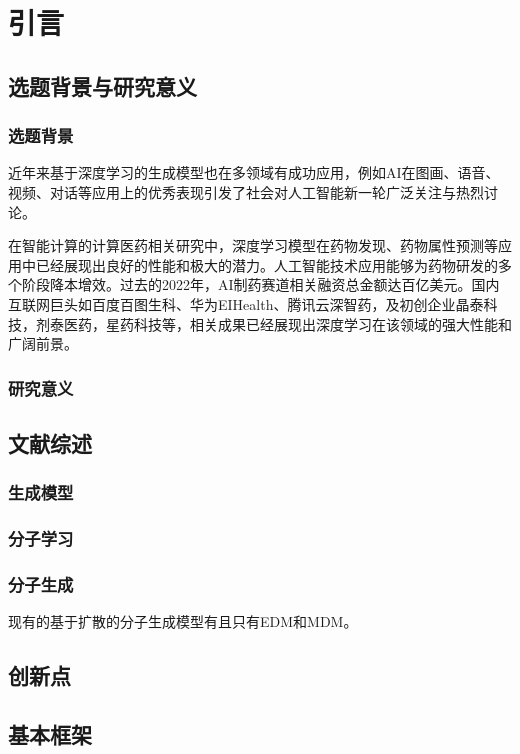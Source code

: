 \mainmatter
\fancyfoot[EC,OC]{\hspace*{1 em}\thepage{}\hspace*{1 em}}
\normalsize
{}
\chapter[引言]{引言}\fancyhead[C]{\xiaowuhao} %
\section{选题背景与研究意义}
\subsection{选题背景}

近年来基于深度学习的生成模型也在多领域有成功应用，例如AI在图画、语音、视频、对话等应用上的优秀表现引发了社会对人工智能新一轮广泛关注与热烈讨论。

在智能计算的计算医药相关研究中，深度学习模型在药物发现、药物属性预测等应用中已经展现出良好的性能和极大的潜力。人工智能技术应用能够为药物研发的多个阶段降本增效。过去的2022年，AI制药赛道相关融资总金额达百亿美元。国内互联网巨头如百度百图生科、华为EIHealth、腾讯云深智药，及初创企业晶泰科技，剂泰医药，星药科技等，相关成果已经展现出深度学习在该领域的强大性能和广阔前景。

\subsection{研究意义}

\section{文献综述}

\subsection{生成模型}

\subsection{分子学习}

\subsection{分子生成}
现有的基于扩散的分子生成模型有且只有EDM\cite{edm_hoogeboom_22}和MDM\cite{mdm_huang_22}。
 
\section{创新点}

\section{基本框架}